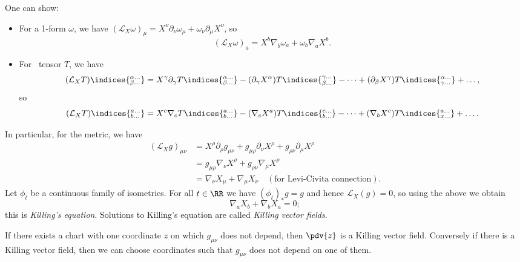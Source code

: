 \documentclass{jknotes}
\begin{document}
One can show:
\begin{itemize}
    \item For a 1-form \(\omega\), we have \((\mathcal{L}_X\omega)_\mu = X^\nu\partial_\nu \omega_\mu + \omega_\nu\partial_\mu X^\nu\), so
        \begin{equation}
            (\mathcal{L}_X\omega)_a = X^b\nabla_b\omega_a + \omega_b\nabla_a X^b.
        \end{equation}
    \item For \ tensor \(T\), we have
        \begin{equation}
            (\mathcal{L}_XT)\indices{^{\alpha\dots}_{\beta\dots}} = X^\gamma\partial_\gamma T\indices{^{\alpha\dots}_{\beta\dots}} - (\partial_\gamma X^\alpha) T\indices{^{\gamma\dots}_{\beta\dots}} - \dots + (\partial_\beta X^\gamma) T\indices{^{\alpha\dots}_{\gamma\dots}} + \dots,
        \end{equation}
        so 
        \begin{equation}
            (\mathcal{L}_X T)\indices{^{a\dots}_{b\dots}} = X^c\nabla_c T\indices{^{a\dots}_{b\dots}} - (\nabla_c X^a)T\indices{^{c\dots}_{b\dots}} - \dots + (\nabla_b X^c)T\indices{^{a\dots}_{x\dots}} + \dots.
        \end{equation}
\end{itemize}

In particular, for the metric, we have
\begin{align}
    (\mathcal{L}_Xg)_{\mu\nu} &= X^\rho\partial_\rho g_{\mu\nu} + g_{\mu\rho}\partial_\nu X^\rho + g_{\rho\nu}\partial_\mu X^\rho \\
                              &= g_{\mu\rho}\nabla_\nu X^\rho + g_{\rho\nu}\nabla_\mu X^\rho \\
                              &= \nabla_\nu X_\mu + \nabla_\mu X_\nu \quad (\text{for Levi-Civita connection}).
\end{align}
Let \(\phi_t\) be a continuous family of isometries. For all \(t\in\RR\) we have \((\phi_t)_*g = g\) and hence \(\mathcal{L}_X(g) = 0\), so using the above we obtain 
\begin{equation}
    \nabla_a X_b + \nabla_b X_a = 0;
\end{equation}
this is \emph{Killing's equation}. Solutions to Killing's equation are called \emph{Killing vector fields}.

If there exists a chart with one coordinate \(z\) on which \(g_{\mu\nu}\) does not depend, then \(\pdv{z}\) is a Killing vector field. Conversely if there is a Killing vector field, then we can choose coordinates such that \(g_{\mu\nu}\) does not depend on one of them.
\end{document}
